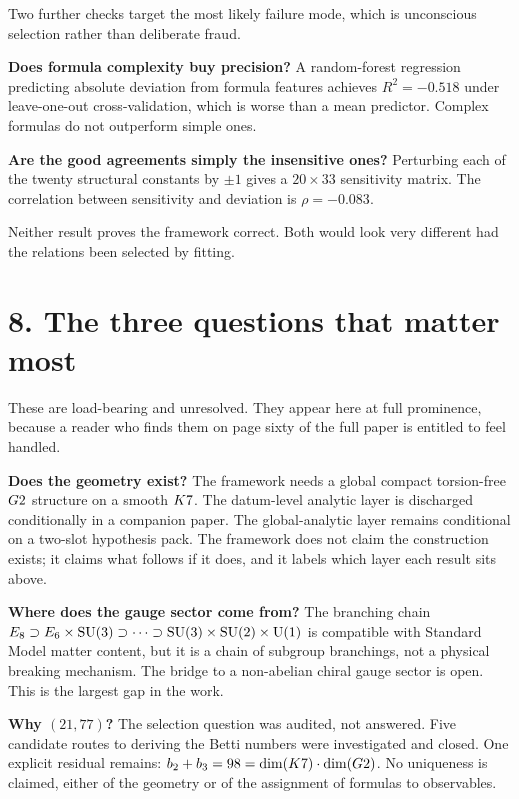 \documentclass[11pt,a4paper]{article}
\begin{document}
Two further checks target the most likely failure mode, which is
unconscious selection rather than deliberate fraud.

\textbf{Does formula complexity buy precision?} A random-forest regression
predicting absolute deviation from formula features achieves
$R^2 = -0.518$ under leave-one-out cross-validation, which is worse than a
mean predictor. Complex formulas do not outperform simple ones.

\textbf{Are the good agreements simply the insensitive ones?} Perturbing
each of the twenty structural constants by $\pm 1$ gives a $20 \times 33$
sensitivity matrix. The correlation between sensitivity and deviation is
$\rho = -0.083$.

Neither result proves the framework correct. Both would look very
different had the relations been selected by fitting.

\section{8. The three questions that matter most}

These are load-bearing and unresolved. They appear here at full
prominence, because a reader who finds them on page sixty of the full
paper is entitled to feel handled.

\textbf{Does the geometry exist?} The framework needs a global compact
torsion-free $G2$ structure on a smooth $K7$. The datum-level
analytic layer is discharged conditionally in a companion paper. The
global-analytic layer remains conditional on a two-slot hypothesis pack.
The framework does not claim the construction exists; it claims what
follows if it does, and it labels which layer each result sits above.

\textbf{Where does the gauge sector come from?} The branching chain
$E_8 \supset E_6 \times \mathrm{SU}(3) \supset \cdots \supset \mathrm{SU}(3) \times
\mathrm{SU}(2) \times \mathrm{U}(1)$ is compatible with Standard Model matter content, but
it is a chain of subgroup branchings, not a physical breaking mechanism.
The bridge to a non-abelian chiral gauge sector is open. This is the
largest gap in the work.

\textbf{Why $(21, 77)$?} The selection question was audited, not answered.
Five candidate routes to deriving the Betti numbers were investigated and
closed. One explicit residual remains: $b_2 + b_3 = 98 =
\dim(K7) \cdot \dim(G2)$. No uniqueness is claimed, either of the
geometry or of the assignment of formulas to observables.
\end{document}
